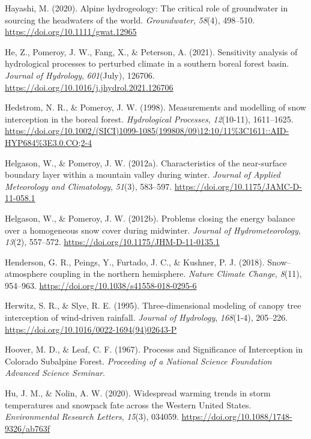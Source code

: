 \documentclass[
  letterpaper,
]{tex/uofsthesis-cs}
\newlength{\cslhangindent}
\newenvironment{CSLReferences}[2] %
 {\begin{list}{}{%
  \setlength{\itemindent}{0pt}
  \setlength{\leftmargin}{0pt}
  \setlength{\parsep}{0pt}
  \ifodd #1
   \setlength{\leftmargin}{\cslhangindent}
   \setlength{\itemindent}{-1\cslhangindent}
  \fi
  \setlength{\itemsep}{#2\baselineskip}}}
 {\end{list}}
\begin{document}
\begin{CSLReferences}{1}{0}
Hayashi, M. (2020). Alpine hydrogeology: {The} critical role of
groundwater in sourcing the headwaters of the world. \emph{Groundwater},
\emph{58}(4), 498--510. \url{https://doi.org/10.1111/gwat.12965}

He, Z., Pomeroy, J. W., Fang, X., \& Peterson, A. (2021). Sensitivity
analysis of hydrological processes to perturbed climate in a southern
boreal forest basin. \emph{Journal of Hydrology}, \emph{601}(July),
126706. \url{https://doi.org/10.1016/j.jhydrol.2021.126706}

Hedstrom, N. R., \& Pomeroy, J. W. (1998). Measurements and modelling of
snow interception in the boreal forest. \emph{Hydrological Processes},
\emph{12}(10-11), 1611--1625.
\url{https://doi.org/10.1002/(SICI)1099-1085(199808/09)12:10/11\%3C1611::AID-HYP684\%3E3.0.CO;2-4}

Helgason, W., \& Pomeroy, J. W. (2012a). Characteristics of the
near-surface boundary layer within a mountain valley during winter.
\emph{Journal of Applied Meteorology and Climatology}, \emph{51}(3),
583--597. \url{https://doi.org/10.1175/JAMC-D-11-058.1}

Helgason, W., \& Pomeroy, J. W. (2012b). Problems closing the energy
balance over a homogeneous snow cover during midwinter. \emph{Journal of
Hydrometeorology}, \emph{13}(2), 557--572.
\url{https://doi.org/10.1175/JHM-D-11-0135.1}

Henderson, G. R., Peings, Y., Furtado, J. C., \& Kushner, P. J. (2018).
Snow--atmosphere coupling in the northern hemisphere. \emph{Nature
Climate Change}, \emph{8}(11), 954--963.
\url{https://doi.org/10.1038/s41558-018-0295-6}

Herwitz, S. R., \& Slye, R. E. (1995). Three-dimensional modeling of
canopy tree interception of wind-driven rainfall. \emph{Journal of
Hydrology}, \emph{168}(1-4), 205--226.
\url{https://doi.org/10.1016/0022-1694(94)02643-P}

Hoover, M. D., \& Leaf, C. F. (1967). Processs and {Significance} of
{Interception} in {Colorado Subalpine Forest}. \emph{Proceeding of a
{National Science Foundation Advanced Science Seminar}}.

Hu, J. M., \& Nolin, A. W. (2020). Widespread warming trends in storm
temperatures and snowpack fate across the {Western United States}.
\emph{Environmental Research Letters}, \emph{15}(3), 034059.
\url{https://doi.org/10.1088/1748-9326/ab763f}


\end{CSLReferences}
\end{document}

